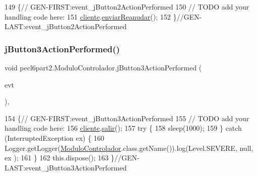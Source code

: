 \begin{DoxyCode}
149                                                                          \{\textcolor{comment}{//
      GEN-FIRST:event\_jButton2ActionPerformed}
150         \textcolor{comment}{// TODO add your handling code here:}
151         \mbox{\hyperlink{classpecl6part2_1_1_modulo_controlador_a62308c2ac095ab8b16d1478b2577891e}{cliente}}.\mbox{\hyperlink{classpecl6part2_1_1_cliente_controlador_af4b9fc77a65fa32d6d9fd5ae39da2b30}{enviarReanudar}}();
152     \}\textcolor{comment}{//GEN-LAST:event\_jButton2ActionPerformed}
\end{DoxyCode}
\mbox{\label{classpecl6part2_1_1_modulo_controlador_a404a336512bfd965be43078ee7382328}} 
\subsubsection{\texorpdfstring{j\+Button3\+Action\+Performed()}{jButton3ActionPerformed()}}
{\footnotesize\ttfamily void pecl6part2.\+Modulo\+Controlador.\+j\+Button3\+Action\+Performed (\begin{DoxyParamCaption}\item[{java.\+awt.\+event.\+Action\+Event}]{evt }\end{DoxyParamCaption})\hspace{0.3cm}{\ttfamily [inline]}, {\ttfamily [private]}}


\begin{DoxyCode}
154                                                                          \{\textcolor{comment}{//
      GEN-FIRST:event\_jButton3ActionPerformed}
155         \textcolor{comment}{// TODO add your handling code here:}
156         \mbox{\hyperlink{classpecl6part2_1_1_modulo_controlador_a62308c2ac095ab8b16d1478b2577891e}{cliente}}.\mbox{\hyperlink{classpecl6part2_1_1_cliente_controlador_a69a201c1f92fec9afb9f0729f784c489}{salir}}();
157         \textcolor{keywordflow}{try} \{
158             sleep(1000);
159         \} \textcolor{keywordflow}{catch} (InterruptedException ex) \{
160             Logger.getLogger(\mbox{\hyperlink{classpecl6part2_1_1_modulo_controlador_ae58d9d09e586f247facba0caab686943}{ModuloControlador}}.class.getName()).log(Level.SEVERE, null, ex
      );
161         \}
162         this.dispose();
163     \}\textcolor{comment}{//GEN-LAST:event\_jButton3ActionPerformed}
\end{DoxyCode}
\mbox{\label{classpecl6part2_1_1_modulo_controlador_a997e0b7b9614d5bc98d2a9741aa49905}} 
